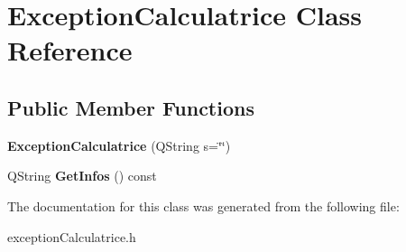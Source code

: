 \hypertarget{class_exception_calculatrice}{\section{Exception\-Calculatrice Class Reference}
\label{class_exception_calculatrice}
}
\subsection*{Public Member Functions}
\begin{DoxyCompactItemize}
\item 
\hypertarget{class_exception_calculatrice_ac40d005f833f378e415cdad4080a065a}{{\bfseries Exception\-Calculatrice} (Q\-String s=\char`\"{}\char`\"{})}\label{class_exception_calculatrice_ac40d005f833f378e415cdad4080a065a}

\item 
\hypertarget{class_exception_calculatrice_ae25e0a80a32fbb5b581b250e76c60081}{Q\-String {\bfseries Get\-Infos} () const }\label{class_exception_calculatrice_ae25e0a80a32fbb5b581b250e76c60081}

\end{DoxyCompactItemize}


The documentation for this class was generated from the following file\-:\begin{DoxyCompactItemize}
\item 
exception\-Calculatrice.\-h\end{DoxyCompactItemize}
